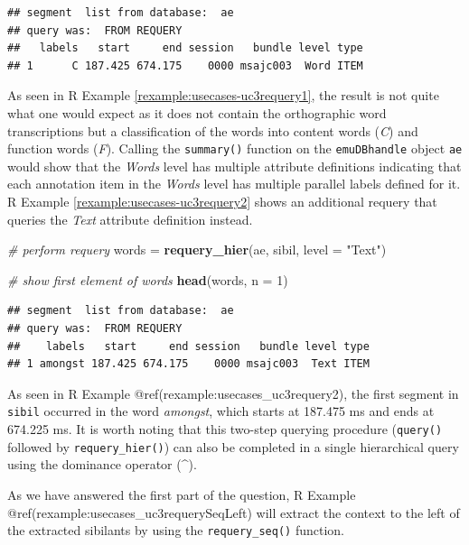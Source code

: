 \documentclass[]{book}
\newenvironment{Shaded}{\begin{snugshade}}{\end{snugshade}}
\newcommand{\CommentTok}[1]{\textcolor[rgb]{0.56,0.35,0.01}{\textit{#1}}}
\newcommand{\DataTypeTok}[1]{\textcolor[rgb]{0.13,0.29,0.53}{#1}}
\newcommand{\DecValTok}[1]{\textcolor[rgb]{0.00,0.00,0.81}{#1}}
\newcommand{\KeywordTok}[1]{\textcolor[rgb]{0.13,0.29,0.53}{\textbf{#1}}}
\newcommand{\NormalTok}[1]{#1}
\newcommand{\StringTok}[1]{\textcolor[rgb]{0.31,0.60,0.02}{#1}}
\theoremstyle{definition}
\theoremstyle{definition}
\theoremstyle{definition}
\theoremstyle{remark}
\begin{document}
\begin{verbatim}
## segment  list from database:  ae 
## query was:  FROM REQUERY 
##   labels   start     end session   bundle level type
## 1      C 187.425 674.175    0000 msajc003  Word ITEM
\end{verbatim}

As seen in R Example \ref{rexample:usecases-uc3requery1}, the result is
not quite what one would expect as it does not contain the orthographic
word transcriptions but a classification of the words into content words
(\emph{C}) and function words (\emph{F}). Calling the \texttt{summary()}
function on the \texttt{emuDBhandle} object \texttt{ae} would show that
the \emph{Words} level has multiple attribute definitions indicating
that each annotation item in the \emph{Words} level has multiple
parallel labels defined for it. R Example
\ref{rexample:usecases-uc3requery2} shows an additional requery that
queries the \emph{Text} attribute definition instead.

\begin{Shaded}
\begin{Highlighting}[]
\CommentTok{# perform requery}
\NormalTok{words =}\StringTok{ }\KeywordTok{requery_hier}\NormalTok{(ae, sibil, }\DataTypeTok{level =} \StringTok{"Text"}\NormalTok{)}

\CommentTok{# show first element of words}
\KeywordTok{head}\NormalTok{(words, }\DataTypeTok{n =} \DecValTok{1}\NormalTok{)}
\end{Highlighting}
\end{Shaded}

\begin{verbatim}
## segment  list from database:  ae 
## query was:  FROM REQUERY 
##    labels   start     end session   bundle level type
## 1 amongst 187.425 674.175    0000 msajc003  Text ITEM
\end{verbatim}

As seen in R Example @ref(rexample:usecases\_uc3requery2), the first
segment in \texttt{sibil} occurred in the word \emph{amongst}, which
starts at 187.475 ms and ends at 674.225 ms. It is worth noting that
this two-step querying procedure (\texttt{query()} followed by
\texttt{requery\_hier()}) can also be completed in a single hierarchical
query using the dominance operator (\^{}).

As we have answered the first part of the question, R Example
@ref(rexample:usecases\_uc3requerySeqLeft) will extract the context to
the left of the extracted sibilants by using the \texttt{requery\_seq()}
function.
\end{document}
